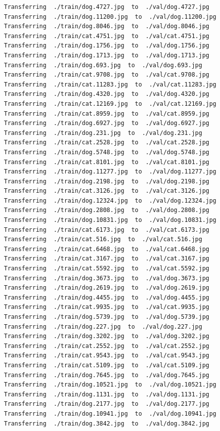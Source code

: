 \documentclass[]{book}
\theoremstyle{definition}
\theoremstyle{definition}
\theoremstyle{definition}
\theoremstyle{remark}
\begin{document}
\begin{verbatim}
Transferring  ./train/dog.4727.jpg  to  ./val/dog.4727.jpg
Transferring  ./train/dog.11200.jpg  to  ./val/dog.11200.jpg
Transferring  ./train/dog.8046.jpg  to  ./val/dog.8046.jpg
Transferring  ./train/cat.4751.jpg  to  ./val/cat.4751.jpg
Transferring  ./train/dog.1756.jpg  to  ./val/dog.1756.jpg
Transferring  ./train/dog.1713.jpg  to  ./val/dog.1713.jpg
Transferring  ./train/dog.693.jpg  to  ./val/dog.693.jpg
Transferring  ./train/cat.9708.jpg  to  ./val/cat.9708.jpg
Transferring  ./train/cat.11283.jpg  to  ./val/cat.11283.jpg
Transferring  ./train/dog.4320.jpg  to  ./val/dog.4320.jpg
Transferring  ./train/cat.12169.jpg  to  ./val/cat.12169.jpg
Transferring  ./train/cat.8959.jpg  to  ./val/cat.8959.jpg
Transferring  ./train/dog.6927.jpg  to  ./val/dog.6927.jpg
Transferring  ./train/dog.231.jpg  to  ./val/dog.231.jpg
Transferring  ./train/cat.2528.jpg  to  ./val/cat.2528.jpg
Transferring  ./train/dog.5748.jpg  to  ./val/dog.5748.jpg
Transferring  ./train/cat.8101.jpg  to  ./val/cat.8101.jpg
Transferring  ./train/dog.11277.jpg  to  ./val/dog.11277.jpg
Transferring  ./train/dog.2198.jpg  to  ./val/dog.2198.jpg
Transferring  ./train/cat.3126.jpg  to  ./val/cat.3126.jpg
Transferring  ./train/dog.12324.jpg  to  ./val/dog.12324.jpg
Transferring  ./train/dog.2808.jpg  to  ./val/dog.2808.jpg
Transferring  ./train/dog.10831.jpg  to  ./val/dog.10831.jpg
Transferring  ./train/cat.6173.jpg  to  ./val/cat.6173.jpg
Transferring  ./train/cat.516.jpg  to  ./val/cat.516.jpg
Transferring  ./train/cat.6468.jpg  to  ./val/cat.6468.jpg
Transferring  ./train/cat.3167.jpg  to  ./val/cat.3167.jpg
Transferring  ./train/cat.5592.jpg  to  ./val/cat.5592.jpg
Transferring  ./train/dog.3673.jpg  to  ./val/dog.3673.jpg
Transferring  ./train/dog.2619.jpg  to  ./val/dog.2619.jpg
Transferring  ./train/dog.4455.jpg  to  ./val/dog.4455.jpg
Transferring  ./train/cat.9935.jpg  to  ./val/cat.9935.jpg
Transferring  ./train/dog.5739.jpg  to  ./val/dog.5739.jpg
Transferring  ./train/dog.227.jpg  to  ./val/dog.227.jpg
Transferring  ./train/dog.3202.jpg  to  ./val/dog.3202.jpg
Transferring  ./train/cat.2552.jpg  to  ./val/cat.2552.jpg
Transferring  ./train/cat.9543.jpg  to  ./val/cat.9543.jpg
Transferring  ./train/cat.5109.jpg  to  ./val/cat.5109.jpg
Transferring  ./train/dog.7645.jpg  to  ./val/dog.7645.jpg
Transferring  ./train/dog.10521.jpg  to  ./val/dog.10521.jpg
Transferring  ./train/dog.1131.jpg  to  ./val/dog.1131.jpg
Transferring  ./train/dog.2177.jpg  to  ./val/dog.2177.jpg
Transferring  ./train/dog.10941.jpg  to  ./val/dog.10941.jpg
Transferring  ./train/dog.3842.jpg  to  ./val/dog.3842.jpg

\end{verbatim}
\end{document}
